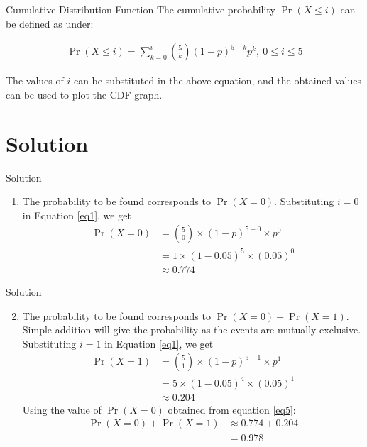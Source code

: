 \documentclass{beamer}
\providecommand{\pr}[1]{\ensuremath{\Pr\left(#1\right)}}
\providecommand{\brak}[1]{\ensuremath{\left(#1\right)}}
\begin{document}
\begin{frame}{Cumulative Distribution Function}
The cumulative probability $ \pr{X \leq i}$ can be defined as under:

\begin{block}{}
\begin{align}
          \label{eq2}
       \pr{X \leq i} = \sum_{k=0}^{i} \binom{5}{k} (1-p)^{5-k} p^k ,~ 0 \le i \le 5
\end{align}
\end{block}

The values of $i$ can be substituted in the above equation, and the obtained values can be used to plot the CDF graph.

\end{frame}


\section{Solution}
\begin{frame}{Solution}
\begin{enumerate}[label=(\roman*)]
  \setcounter{enumi}{0}
\item The probability to be found corresponds to $\pr{X=0}$. Substituting $i=0$ in Equation \ref{eq1}, we get
\begin{align}
    \pr{X=0} &= \binom{5}{0} \times {(1-p)}^{5-0} \times p^0 \\
             &= 1 \times \brak{1-0.05}^{5} \times \brak{0.05}^0 \\
             \label{eq5}
             &\approx 0.774
\end{align}
\end{enumerate}
\end{frame}

\begin{frame}{Solution}
\begin{enumerate}[label=(\roman*)]
  \setcounter{enumi}{1}
\item The probability to be found corresponds to $\pr{X=0}+\pr{X=1}$. Simple addition will give the probability as the events are mutually exclusive. Substituting $i=1$ in Equation \ref{eq1}, we get
\begin{align}
    \pr{X=1} &= \binom{5}{1} \times {(1-p)}^{5-1} \times p^1 \\
             &= 5 \times \brak{1-0.05}^{4} \times \brak{0.05}^1 \\
             &\approx 0.204
\end{align}
    Using the value of \pr{X=0} obtained from equation \ref{eq5}:
    \begin{align}
    \pr{X=0} + \pr{X=1} &\approx 0.774+0.204 \\
             &= 0.978
\end{align}
\end{enumerate}
\end{frame}
\end{document}
